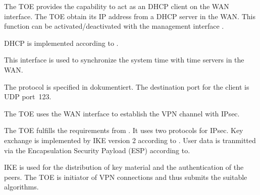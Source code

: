 



The TOE provides the capability to act as an DHCP client on the WAN
interface. The TOE obtain its IP address from a DHCP server in the WAN. This function can be activated/deactivated with the management interface \lslanhttpmgmt{}.



DHCP is implemented according to .



This interface is used to synchronize the system time with time servers in the
WAN.



The protocol is specified in  dokumentiert. The destination port
for the client is UDP port~123.



The TOE uses the WAN interface to establish the VPN channel with IPsec.



The TOE fulfills the requirements from . It uses two protocols for
IPsec. Key exchange is implemented by IKE version 2 according to
. User data is tranmitted via the Encapsulation Security Payload
(ESP) according to. 


IKE is used for the distribution of key material and the authentication of the
peers. The TOE is initiator of VPN connections and thus submits the suitable algorithms.



